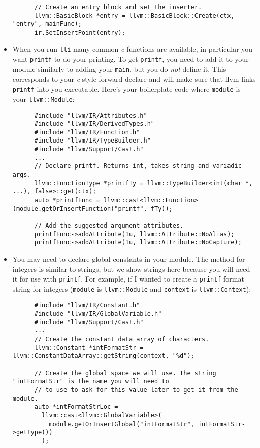 \documentclass{article}
\newcommand{\code}[1]{\texttt{\textmd{#1}}}
\begin{document}
\begin{itemize}
\begin{lstlisting}
      // Create an entry block and set the inserter.
      llvm::BasicBlock *entry = llvm::BasicBlock::Create(ctx, "entry", mainFunc);
      ir.SetInsertPoint(entry);
    \end{lstlisting}
  \item
    When you run \code{lli} many common \textit{c} functions are available, in particular you want
    \code{printf} to do your printing. To get \code{printf}, you need to add it to your module
    similarly to adding your \code{main}, but you do \textit{not} define it. This corresponds to
    your \textit{c}-style forward declare and will make sure that llvm links \code{printf} into
    you executable. Here's your boilerplate code where \code{module} is your \code{llvm::Module}:
    \begin{lstlisting}
      #include "llvm/IR/Attributes.h"
      #include "llvm/IR/DerivedTypes.h"
      #include "llvm/IR/Function.h"
      #include "llvm/IR/TypeBuilder.h"
      #include "llvm/Support/Cast.h"
      ...
      // Declare printf. Returns int, takes string and variadic args.
      llvm::FunctionType *printfTy = llvm::TypeBuilder<int(char *, ...), false>::get(ctx);
      auto *printfFunc = llvm::cast<llvm::Function>(module.getOrInsertFunction("printf", fTy));

      // Add the suggested argument attributes.
      printfFunc->addAttribute(1u, llvm::Attribute::NoAlias);
      printfFunc->addAttribute(1u, llvm::Attribute::NoCapture);
    \end{lstlisting}
  \item
    You may need to declare global constants in your module. The method for integers is similar to
    strings, but we show strings here because you will need it for use with \code{printf}. For
    example, if I wanted to create a \code{printf} format string for integers (\code{module} is
    \code{llvm::Module} and \code{context} is \code{llvm::Context}):
    \begin{lstlisting}
      #include "llvm/IR/Constant.h"
      #include "llvm/IR/GlobalVariable.h"
      #include "llvm/Support/Cast.h"
      ...
      // Create the constant data array of characters.
      llvm::Constant *intFormatStr = llvm::ConstantDataArray::getString(context, "%d");

      // Create the global space we will use. The string "intFormatStr" is the name you will need to
      // to use to ask for this value later to get it from the module.
      auto *intFormatStrLoc =
        llvm::cast<llvm::GlobalVariable>(
          module.getOrInsertGlobal("intFormatStr", intFormatStr->getType())
        );


\end{lstlisting}
\end{itemize}
\end{document}
